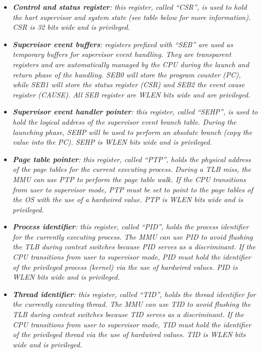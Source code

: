 \begin{itemize}
                \item \textit{\textbf{Control and status register}: this register, called ``CSR'', is used to hold the hart supervisor and system state (see table below for more information). CSR is 32 bits wide and is privileged.}

                \item \textit{\textbf{Supervisor event buffers}: registers prefixed with ``SEB'' are used as temporary buffers for supervisor event handling. They are transparent registers and are automatically managed by the CPU during the launch and return phase of the handling. SEB0 will store the program counter (PC), while SEB1 will store the status register (CSR) and SEB2 the event cause register (CAUSE). All SEB register are WLEN bits wide and are privileged.}

                \item \textit{\textbf{Supervisor event handler pointer}: this register, called ``SEHP'', is used to hold the logical address of the supervisor event branch table. During the launching phase, SEHP will be used to perform an absolute branch (copy the value into the PC). SEHP is WLEN bits wide and is privileged.}

                \item \textit{\textbf{Page table pointer}: this register, called ``PTP'', holds the physical address of the page tables for the current executing process. During a TLB miss, the MMU can use PTP to perform the page table walk. If the CPU transitions from user to supervisor mode, PTP must be set to point to the page tables of the OS with the use of a hardwired value. PTP is WLEN bits wide and is privileged.}

                \item \textit{\textbf{Process identifier}: this register, called ``PID'', holds the process identifier for the currently executing process. The MMU can use PID to avoid flushing the TLB during context switches because PID serves as a discriminant. If the CPU transitions from user to supervisor mode, PID must hold the identifier of the privileged process (kernel) via the use of hardwired values. PID is WLEN bits wide and is privileged.}

                \item \textit{\textbf{Thread identifier}: this register, called ``TID'', holds the thread identifier for the currently executing thread. The MMU can use TID to avoid flushing the TLB during context switches because TID serves as a discriminant. If the CPU transitions from user to supervisor mode, TID must hold the identifier of the privileged thread via the use of hardwired values. TID is WLEN bits wide and is privileged.}


\end{itemize}
